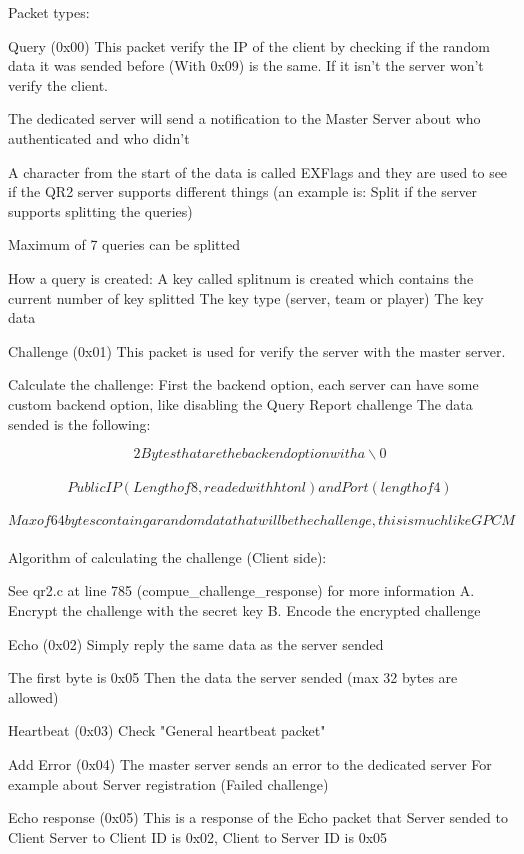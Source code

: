\documentclass[oneside,titlepage,a4paper]{Definition/retrospy} %
\begin{document}
Packet types:

Query (0x00)
This packet verify the IP of the client by checking if the random data
it was sended before (With 0x09) is the same. If it isn't the server won't
verify the client.

The dedicated server will send a notification to the Master Server about who
authenticated and who didn't

A character from the start of the data is called EXFlags and they are used to see if the QR2
server supports different things (an example is: Split if the server supports splitting the queries)

Maximum of 7 queries can be splitted

How a query is created:
A key called splitnum is created which contains the current number of key splitted
The key type (server, team or player)
The key data

Challenge (0x01)
This packet is used for verify the server with the master server.

Calculate the challenge:
First the backend option, each server can have some custom backend option, like disabling the Query Report challenge
The data sended is the following:

\[2 Bytes that are the backend option with a \backslash 0\] \\
\[Public IP (Length of 8, readed with htonl) and Port (length of 4)\]\\
\[ Max of 64 bytes containg a random data that will be the challenge, this is much like GPCM \]\\

Algorithm of calculating the challenge (Client side):

See qr2.c at line 785 (compue\_challenge\_response) for more information
A. Encrypt the challenge with the secret key
B. Encode the encrypted challenge

Echo (0x02)
Simply reply the same data as the server sended

The first byte is 0x05
Then the data the server sended (max 32 bytes are allowed)

Heartbeat (0x03)
Check "General heartbeat packet"

Add Error (0x04)
The master server sends an error to the dedicated server
For example about Server registration (Failed challenge)

Echo response (0x05)
This is a response of the Echo packet that Server sended to Client
Server to Client ID is 0x02, Client to Server ID is 0x05
\end{document}
